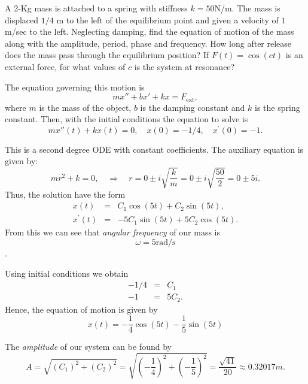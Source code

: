 \documentclass[11pt]{article}
\begin{document}
\begin{problem}
A 2-Kg mass is attached to a spring with stiffness $k = 50$N/m. The mass is displaced $1/4$ m to the left of the equilibrium point and given a velocity of $1$m/sec to the left. Neglecting damping, find the equation of motion of the mass along with the amplitude, period, phase and frequency. How long after release does the mass pass through the equilibrium position? If $F(t)=\cos(ct)$ is an external force, for what values of $c$ is the system at resonance?
\end{problem}
\begin{solution}

The equation governing this motion is $$mx''+bx'+kx=F_{\text{ext}},$$
where $m$ is the mass of the object, $b$ is the damping constant and $k$ is the spring constant. Then, with the initial conditions the equation to solve is
\begin{equation*}
m x''(t) + k x(t) = 0, \quad x(0) = -1/4 , \quad x^{\prime}(0) = -1.
\end{equation*}

This is a second degree ODE with constant coefficients. The auxiliary equation is given by:
\begin{equation*}
m r^2 +k =0, \quad \Rightarrow \quad r = 0 \pm i \sqrt{\dfrac{k}{m}} = 0 \pm i \sqrt{\dfrac{50}{2}} = 0 \pm 5 i.
\end{equation*}
Thus, the solution have the form
\begin{eqnarray*}
x(t) & = & C_{1} \cos(5 t) + C_{2} \sin(5 t), \\
x^{\prime}(t) & = & - 5 C_{1} \sin(5 t) + 5 C_{2} \cos(5 t).
\end{eqnarray*}
From this we can see that \textit{angular frequency} of our mass is $$\boxed{\omega = 5 \text{rad/s}}$$.

Using initial conditions we obtain
\begin{eqnarray*}
-1/4 & = & C_{1}  \\
-1 & = &  5 C_{2} .
\end{eqnarray*}
Hence, the equation of motion is given by
\begin{equation*}
x(t) =  -\dfrac{1}{4} \cos(5 t) -\dfrac{1}{5} \sin(5 t)
\end{equation*}

The \textit{amplitude} of our system can be found by
\begin{equation*}
\boxed{A =  \sqrt{\left(C_{1}\right)^2 + \left(C_{2}\right)^2} = \sqrt{\left(-\dfrac{1}{4}\right)^2 + \left(-\dfrac{1}{5}\right)^2} = \dfrac{\sqrt{41}}{20}} \approx 0.32017 m.
\end{equation*}


\end{solution}
\end{document}
